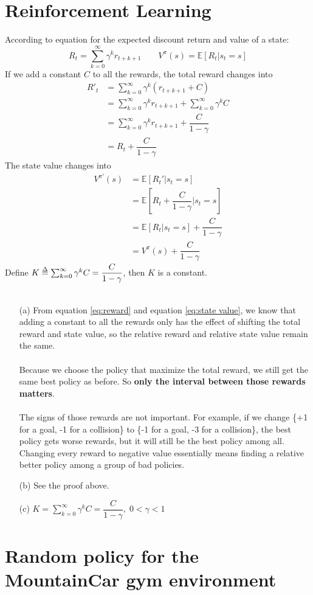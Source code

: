 \documentclass{article}
\def\delequal{\mathrel{\ensurestackMath{\stackon[1pt]{=}{\scriptstyle\Delta}}}}
\begin{document}
    \section{Reinforcement Learning \uppercase\expandafter{}}
    According to equation for the expected discount return and value of a state:
    $$R_t=\sum_{k=0}^{\infty}\gamma^kr_{t+k+1}\qquad V^{\pi}(s)=\mathbb{E}[R_t|s_t=s]$$
    If we add a constant $C$ to all the rewards, the total reward changes into
    \begin{equation}\label{eq:reward}
    	\begin{split}
    	R'_t
    	&=\sum_{k=0}^{\infty}\gamma^k(r_{t+k+1}+C)\\
    	&=\sum_{k=0}^{\infty}\gamma^kr_{t+k+1}+\sum_{k=0}^{\infty}\gamma^kC\\
    	&=\sum_{k=0}^{\infty}\gamma^kr_{t+k+1}+\dfrac{C}{1-\gamma} \\
    	&=R_t+\dfrac{C}{1-\gamma}
    	\end{split}
    \end{equation}
    The state value changes into
    \begin{equation}\label{eq:state value}
    	\begin{split}
    	V^{\pi'}(s)
    	&=\mathbb{E}[R_t'|s_t=s]\\
    	&=\mathbb{E}[R_t+\dfrac{C}{1-\gamma}|s_t=s]\\
    	&=\mathbb{E}[R_t|s_t=s]+\dfrac{C}{1-\gamma}\\
    	&=V^{\pi}(s)+\dfrac{C}{1-\gamma}
    	\end{split}
    \end{equation}
    Define $K\delequal\sum_{k=0}^{\infty}\gamma^kC=\dfrac{C}{1-\gamma}$, then $K$ is a constant.\\\\
    \begin{enumerate}
    	\item[(a)]
    	From equation \ref{eq:reward} and equation \ref{eq:state value}, we know that adding a constant to all the rewards only has the effect of shifting the total reward and state value, so the relative reward and relative state value remain the same. \\\\
    	Because we choose the policy that maximize the total reward, we still get the same best policy as before. So \textbf{only the interval between those rewards matters}.\\\\
    	The signs of those rewards are not important. For example, if we change \{+1 for a goal, -1 for a collision\} to \{-1 for a goal, -3 for a collision\}, the best policy gets worse rewards, but it will still be the best policy among all. Changing every reward to negative value essentially means finding a relative better policy among a group of bad policies.
    	\item[(b)]See the proof above.
    	\item[(c)]$K=\sum_{k=0}^{\infty}\gamma^kC=\dfrac{C}{1-\gamma},\; 0<\gamma<1$
    \end{enumerate}
    
    	
    \section{Random policy for the MountainCar gym environment}
       
\end{document}
